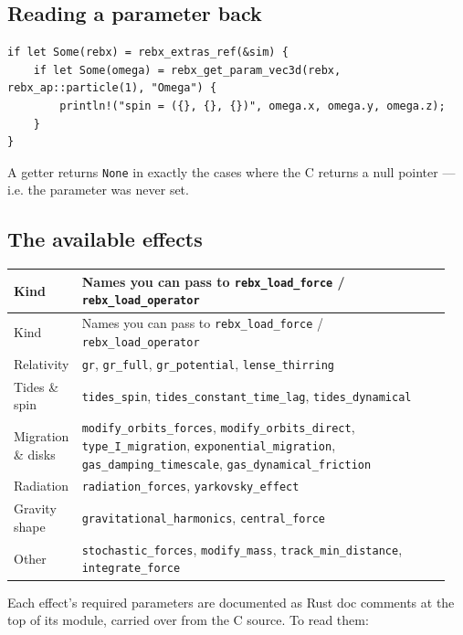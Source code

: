 \documentclass[11pt]{article}
\begin{document}
\subsection{Reading a parameter back}

\begin{lstlisting}
if let Some(rebx) = rebx_extras_ref(&sim) {
    if let Some(omega) = rebx_get_param_vec3d(rebx, rebx_ap::particle(1), "Omega") {
        println!("spin = ({}, {}, {})", omega.x, omega.y, omega.z);
    }
}
\end{lstlisting}

A getter returns \texttt{None} in exactly the cases where the C returns a null pointer --- i.e. the parameter was never set.

\subsection{The available effects}

\begin{longtable}{L{0.102\linewidth}L{0.848\linewidth}}
\toprule
Kind & Names you can pass to \texttt{rebx\_load\_force} / \texttt{rebx\_load\_operator} \\
\midrule
\endfirsthead
\toprule
Kind & Names you can pass to \texttt{rebx\_load\_force} / \texttt{rebx\_load\_operator} \\
\midrule
\endhead
Relativity & \texttt{gr}, \texttt{gr\_full}, \texttt{gr\_potential}, \texttt{lense\_thirring} \\
Tides \& spin & \texttt{tides\_spin}, \texttt{tides\_constant\_time\_lag}, \texttt{tides\_dynamical} \\
Migration \& disks & \texttt{modify\_orbits\_forces}, \texttt{modify\_orbits\_direct}, \texttt{type\_I\_migration}, \texttt{exponential\_migration}, \texttt{gas\_damping\_timescale}, \texttt{gas\_dynamical\_friction} \\
Radiation & \texttt{radiation\_forces}, \texttt{yarkovsky\_effect} \\
Gravity shape & \texttt{gravitational\_harmonics}, \texttt{central\_force} \\
Other & \texttt{stochastic\_forces}, \texttt{modify\_mass}, \texttt{track\_min\_distance}, \texttt{integrate\_force} \\
\bottomrule
\end{longtable}

Each effect's required parameters are documented as Rust doc comments at the top of its module, carried over from the C source. To read them:
\end{document}

